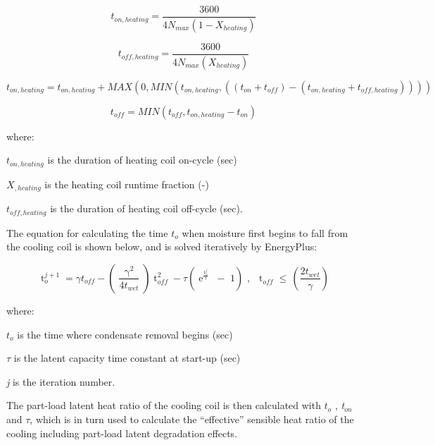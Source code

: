 \begin{equation}
t_{on,heating} = \frac{{3600}}{{4N_{max}\left( {1 - X_{heating}} \right)}}
\end{equation}

\begin{equation}
t_{off,heating} = \frac{{3600}}{{4N_{max}\left( {X_{heating}} \right)}}
\end{equation}

{\scriptsize
\begin{equation}
t_{on,heating} = t_{on,heating} + MAX\left( {0,MIN\left( {t_{on,heating},\left( {\left( {t_{on} + t_{off}} \right) - \left( {t_{on,heating} + t_{off,heating}} \right)} \right)} \right)} \right)
\end{equation}}

\begin{equation}
t_{off} = MIN\left( {t_{off},t_{on,heating} - t_{on}} \right)
\end{equation}

where:

\(t_{on,heating}\) is the duration of heating coil on-cycle (sec)

\(X_{,heating}\) is the heating coil runtime fraction (-)

\(t_{off,heating}\) is the duration of heating coil off-cycle (sec).

The equation for calculating the time \(t_{o}\) when moisture first begins to fall from the cooling coil is shown below, and is solved iteratively by EnergyPlus:

\begin{equation}
\mathop t\nolimits_o^{j + 1}  = \gamma {t_{off}} - \left( {\frac{{\mathop \gamma \nolimits^2 }}{{4{t_{wet}}}}} \right)\mathop t\nolimits_{off}^2  - \tau \left( {\mathop e\nolimits^{\frac{{\mathop t\nolimits_o^j }}{\tau }} \,\, - \,\,1} \right)\,\,,\,\,\,\mathop t\nolimits_{off}^{}  \le \,\left( {\frac{{2{t_{wet}}}}{\gamma }} \right)
\end{equation}

where:

\({t_o}\) is the time where condensate removal begins (sec)

\(\tau\) is the latent capacity time constant at start-up (sec)

\emph{j} is the iteration number.

The part-load latent heat ratio of the cooling coil is then calculated with \(t_o\) , \emph{t\(_{on}\)} and \(\tau\), which is in turn used to calculate the ``effective'' sensible heat ratio of the cooling including part-load latent degradation effects.


